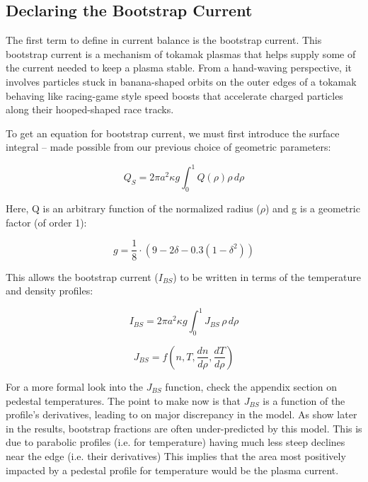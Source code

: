 \documentclass[11pt]{book}
\begin{document}
\subsection{Declaring the Bootstrap Current}

The first term to define in current balance is the bootstrap current. This bootstrap current is a mechanism of tokamak plasmas that helps supply some of the current needed to keep a plasma stable. From a hand-waving perspective, it involves particles stuck in banana-shaped orbits on the outer edges of a tokamak behaving like racing-game style speed boosts that accelerate charged particles along their hooped-shaped race tracks.

To get an equation for bootstrap current, we must first introduce the surface integral -- made possible from our previous choice of geometric parameters:

\begin{equation}
	Q_S = 2 \pi a^2 \kappa g \int_0^1 Q(\rho) \rho \, d\rho
\end{equation}

Here, Q is an arbitrary function of the normalized radius ($\rho$) and g is a geometric factor (of order 1):

\begin{equation}
	g = \frac{1}{8} \cdot \left( 9 - 2 \delta - 0.3 \left( 1 - \delta^2 \right)  \right)
\end{equation}
 
This allows the bootstrap current ($I_{BS}$) to be written in terms of the temperature and density profiles:

\begin{equation}
	I_{BS} = 2 \pi a^2 \kappa g \int_0^1 J_{BS} \, \rho \, d\rho
\end{equation}

\begin{equation}
	J_{BS} = f\left( n , T , \frac{dn}{d\rho} , \frac{dT}{d\rho}  \right)
\end{equation}
 
For a more formal look into the $J_{BS}$ function, check the appendix section on pedestal temperatures. The point to make now is that $J_{BS}$ is a function of the profile's derivatives, leading to on major discrepancy in the model. As show later in the results, bootstrap fractions are often under-predicted by this model. This is due to parabolic profiles (i.e. for temperature) having much less steep declines near the edge (i.e. their derivatives) This implies that the area most positively impacted by a pedestal profile for temperature would be the plasma current.
\end{document}
